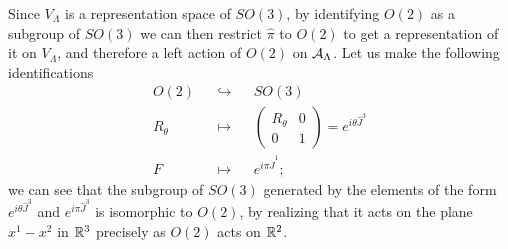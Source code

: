 Since $V_\Lambda$ is a representation space of $SO(3)$, by identifying $O(2)$ as a subgroup of $SO(3)$ we can then restrict $\hat \pi$ to $O(2)$ to get a representation of it on $V_\Lambda$, and therefore a left action of $O(2)$ on $\mathcal A_\Lambda$. Let us make the following identifications
\begin{align*}
    O(2) && \hookrightarrow && SO(3)\\
    R_\theta && \mapsto && \begin{pmatrix} R_\theta & 0 \\ 0 & 1 \end{pmatrix} = e^{i\theta \hat J^3}\\
    F && \mapsto && e^{i\pi \hat J^1};
\end{align*}
we can see that the subgroup of $SO(3)$ generated by the elements of the form $e^{i\theta \hat J^3}$ and $e^{i\pi \hat J^3}$ is isomorphic to $O(2)$, by realizing that it acts on the plane $x^1-x^2$ in $\mathbb{R}^3$ precisely as $O(2)$ acts on $\mathbb{R}^2$.

